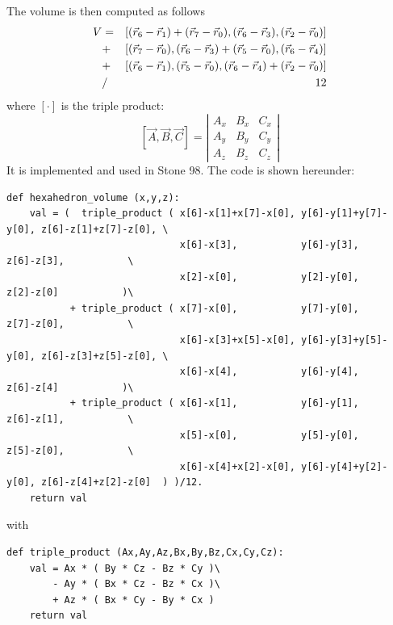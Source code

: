 The volume is then computed as follows
\begin{eqnarray}
V &=& [(\vec{r}_6-\vec{r}_1)+(\vec{r}_7-\vec{r}_0),(\vec{r}_6-\vec{r}_3),(\vec{r}_2-\vec{r}_0)] \nonumber\\
  &+& [(\vec{r}_7-\vec{r}_0),(\vec{r}_6-\vec{r}_3)+(\vec{r}_5-\vec{r}_0),(\vec{r}_6-\vec{r}_4)] \nonumber\\
  &+& [(\vec{r}_6-\vec{r}_1),(\vec{r}_5-\vec{r}_0),(\vec{r}_6-\vec{r}_4)+(\vec{r}_2-\vec{r}_0)] \nonumber\\
  &/& 12
\end{eqnarray}
where $[\cdot]$ is the triple product:
\[
[\vec{A},\vec{B},\vec{C}] = 
\left|
\begin{array}{ccc}
A_x & B_x & C_x \\
A_y & B_y & C_y \\
A_z & B_z & C_z 
\end{array}
\right|
\]
It is implemented and used in Stone 98. The code is shown hereunder:
\begin{lstlisting}
def hexahedron_volume (x,y,z):
    val = (  triple_product ( x[6]-x[1]+x[7]-x[0], y[6]-y[1]+y[7]-y[0], z[6]-z[1]+z[7]-z[0], \
                              x[6]-x[3],           y[6]-y[3],           z[6]-z[3],           \
                              x[2]-x[0],           y[2]-y[0],           z[2]-z[0]           )\
           + triple_product ( x[7]-x[0],           y[7]-y[0],           z[7]-z[0],           \
                              x[6]-x[3]+x[5]-x[0], y[6]-y[3]+y[5]-y[0], z[6]-z[3]+z[5]-z[0], \
                              x[6]-x[4],           y[6]-y[4],           z[6]-z[4]           )\
           + triple_product ( x[6]-x[1],           y[6]-y[1],           z[6]-z[1],           \
                              x[5]-x[0],           y[5]-y[0],           z[5]-z[0],           \
                              x[6]-x[4]+x[2]-x[0], y[6]-y[4]+y[2]-y[0], z[6]-z[4]+z[2]-z[0]  ) )/12.
    return val
\end{lstlisting}
with 
\begin{lstlisting}
def triple_product (Ax,Ay,Az,Bx,By,Bz,Cx,Cy,Cz):
    val = Ax * ( By * Cz - Bz * Cy )\
        - Ay * ( Bx * Cz - Bz * Cx )\
        + Az * ( Bx * Cy - By * Cx )
    return val
\end{lstlisting}

